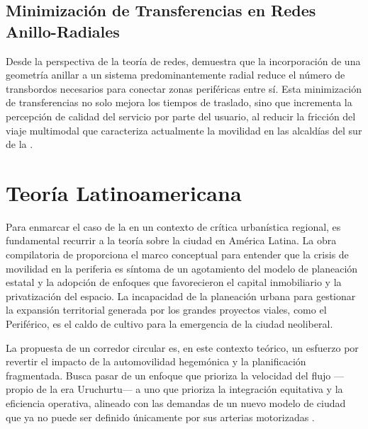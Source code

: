 \subsection{Minimización de Transferencias en Redes Anillo-Radiales}
\label{subsec:minimizacion-transferencias}

Desde la perspectiva de la teoría de redes, \textcite{owais2020} demuestra que la
incorporación de una geometría anillar a un sistema predominantemente radial reduce
el número de transbordos necesarios para conectar zonas periféricas entre sí. Esta
minimización de transferencias no solo mejora los tiempos de traslado, sino que
incrementa la percepción de calidad del servicio por parte del usuario, al reducir la
fricción del viaje multimodal que caracteriza actualmente la movilidad en las alcaldías
del sur de la \cdmx{}.

\section{Teoría Latinoamericana}
\label{sec:teoria-latinoamericana}

Para enmarcar el caso de la \cdmx{} en un contexto de crítica urbanística regional,
es fundamental recurrir a la teoría sobre la ciudad en América Latina. La obra
compilatoria de \textcite{padilla2007} proporciona el marco conceptual para entender
que la crisis de movilidad en la periferia es síntoma de un agotamiento del modelo
de planeación estatal y la adopción de enfoques que favorecieron el capital
inmobiliario y la privatización del espacio. La incapacidad de la planeación urbana
para gestionar la expansión territorial generada por los grandes proyectos viales,
como el Periférico, es el caldo de cultivo para la emergencia de la ciudad neoliberal.

La propuesta de un corredor circular es, en este contexto teórico, un esfuerzo por
revertir el impacto de la automovilidad hegemónica y la planificación fragmentada.
Busca pasar de un enfoque que prioriza la velocidad del flujo ---propio de la era
Uruchurtu--- a uno que prioriza la integración equitativa y la eficiencia operativa,
alineado con las demandas de un nuevo modelo de ciudad que ya no puede ser
definido únicamente por sus arterias motorizadas \parencite{franco2022}.

